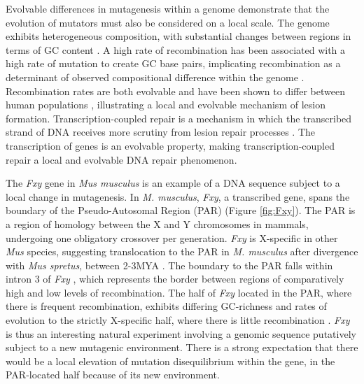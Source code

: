 Evolvable differences in mutagenesis within a genome demonstrate that the evolution of mutators must also be considered on a local scale. The genome exhibits heterogeneous composition, with substantial changes between regions in terms of GC content \citep{Bernardi1989TheGenome, Bernardi2000IsochoresVertebrates}. A high rate of recombination has been associated with a high rate of mutation to create GC base pairs, implicating recombination as a determinant of observed compositional difference within the genome \citep{Montoya-Burgos2003RecombinationGenomes, Duret2006AEvolution}. Recombination rates are both evolvable and have been shown to differ between human populations \citep{Wegmann2011RecombinationInference}, illustrating a local and evolvable mechanism of lesion formation. Transcription-coupled repair is a mechanism in which the transcribed strand of DNA receives more scrutiny from lesion repair processes \citep{Touchon2003Transcription-coupledGenome}. The transcription of genes is an evolvable property, making transcription-coupled repair a local and evolvable DNA repair phenomenon. 

The \textit{Fxy} gene in \textit{Mus musculus} is an example of a DNA sequence subject to a local change in mutagenesis. In \textit{M. musculus}, \textit{Fxy}, a transcribed gene, spans the boundary of the \gls{Pseudo-Autosomal Region} (PAR) \citep{Palmer1997AMice} (Figure \ref{fig:Fxy}). The PAR is a region of homology between the X and Y chromosomes in mammals, undergoing one obligatory crossover per generation. \textit{Fxy} is X-specific in other \textit{Mus} species, suggesting translocation to the PAR in \textit{M. musculus} after divergence with \textit{Mus spretus}, between 2-3MYA \citep{Huang2005HowMammals}. The boundary to the PAR falls within intron 3 of \textit{Fxy} \citep{Palmer1997AMice}, which represents the border between regions of comparatively high and low levels of recombination. The half of \textit{Fxy} located in the PAR, where there is frequent recombination, exhibits differing GC-richness and rates of evolution to the strictly X-specific half, where there is little recombination \citep{Perry1999EvolutionaryPosition}. \textit{Fxy} is thus an interesting natural experiment involving a genomic sequence putatively subject to a new mutagenic environment. There is a strong expectation that there would be a local elevation of mutation disequilibrium within the gene, in the PAR-located half because of its new environment. 



